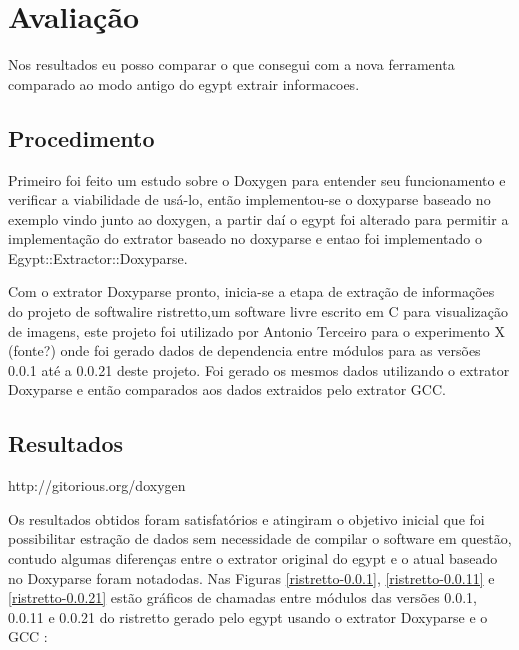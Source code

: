 \chapter{Avaliação}

Nos resultados eu posso comparar o que consegui com a nova ferramenta comparado ao modo antigo do egypt extrair informacoes.

\section{Procedimento}

Primeiro foi feito um estudo sobre o Doxygen para entender seu funcionamento e
verificar a viabilidade de usá-lo, então implementou-se o doxyparse baseado no
exemplo vindo junto ao doxygen, a partir daí o egypt foi alterado para permitir
a implementação do extrator baseado no doxyparse e entao foi implementado o
Egypt::Extractor::Doxyparse.

Com o extrator Doxyparse pronto, inicia-se a etapa de extração de informações do projeto de softwalire ristretto,um software livre escrito em C para visualização de imagens, este projeto foi utilizado por Antonio Terceiro para o experimento X (fonte?) onde foi gerado dados de dependencia entre módulos para as versões 0.0.1 até a 0.0.21 deste projeto. Foi gerado os mesmos dados utilizando o extrator Doxyparse e então comparados aos dados extraidos pelo extrator GCC.

\section{Resultados}

http://gitorious.org/doxygen

Os resultados obtidos foram satisfatórios e atingiram o objetivo inicial que foi possibilitar estração de dados sem necessidade de compilar o software em questão, contudo algumas diferenças entre o extrator original do egypt e o atual baseado no Doxyparse foram notadodas. Nas Figuras \ref{ristretto-0.0.1}, \ref{ristretto-0.0.11} e \ref{ristretto-0.0.21} estão gráficos de chamadas entre módulos das versões 0.0.1, 0.0.11 e 0.0.21 do ristretto gerado pelo egypt usando o extrator Doxyparse e o GCC :

